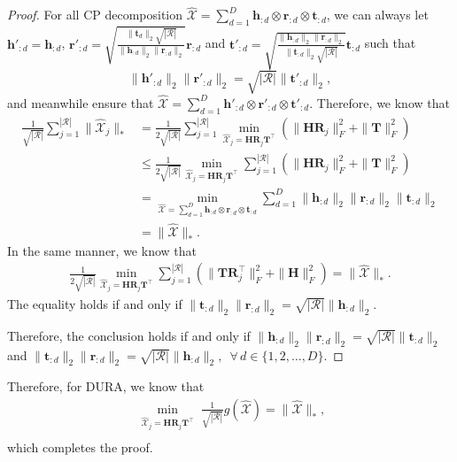 \documentclass{article}
\begin{document}
\begin{proof}
For all CP decomposition $\hat{\mathcal{X}}=\sum_{d=1}^D \textbf{h}_{:d} \otimes \textbf{r}_{:d} \otimes \textbf{t}_{:d}$,  we can always let $\textbf{h}'_{:d}=\textbf{h}_{:d}$, $\textbf{r}'_{:d}=\sqrt{\frac{\|\textbf{t}_d\|_2\sqrt{|\mathcal{R}|}}{\|\textbf{h}_{:d}\|_2\|\textbf{r}_{:d}\|_2}}\textbf{r}_{:d}$ and $\textbf{t}'_{:d}= \sqrt{\frac{\|\textbf{h}_{:d}\|_2\|\textbf{r}_{:d}\|_2}{\|\textbf{t}_{:d}\|_2\sqrt{|\mathcal{R}|}}}\textbf{t}_{:d}$ such that
$$\|\textbf{h}'_{:d}\|_2\|\textbf{r}'_{:d}\|_2=\sqrt{|\mathcal{R}|}\|\textbf{t}'_{:d}\|_2,$$
and meanwhile ensure that $\hat{\mathcal{X}}=\sum_{d=1}^D \textbf{h}'_{:d} \otimes \textbf{r}'_{:d} \otimes \textbf{t}'_{:d}$. Therefore, we know that
\begin{align*}
    \frac{1}{\sqrt{|\mathcal{R}|}}\sum_{j=1}^{|\mathcal{R}|}\|\hat{\mathcal{X}}_j\|_*&=\frac{1}{2\sqrt{|\mathcal{R}|}}\sum_{j=1}^{|\mathcal{R}|}\min_{\hat{\mathcal{X}}_j=\textbf{H}\textbf{R}_j\textbf{T}^\top}(\|\textbf{H}\textbf{R}_j\|_F^2+\|\textbf{T}\|_F^2)\\
    &\le\frac{1}{2\sqrt{|\mathcal{R}|}}\min_{\hat{\mathcal{X}}_j=\textbf{H}\textbf{R}_j\textbf{T}^\top}\sum_{j=1}^{|\mathcal{R}|}(\|\textbf{H}\textbf{R}_j\|_F^2+\|\textbf{T}\|_F^2)\\
    &= \min_{\hat{\mathcal{X}}=\sum_{d=1}^D \textbf{h}_{:d}\otimes \textbf{r}_{:d}\otimes \textbf{t}_{:d}}\sum_{d=1}^D\|\textbf{h}_{:d}\|_2\|\textbf{r}_{:d}\|_2\|\textbf{t}_{:d}\|_2\\
    &=\|\hat{\mathcal{X}}\|_*.
\end{align*}
In the same manner, we know that
\begin{align*}
    \frac{1}{2\sqrt{|\mathcal{R}|}}\min_{\hat{\mathcal{X}}_j=\textbf{H}\textbf{R}_j\textbf{T}^\top}\sum_{j=1}^{|\mathcal{R}|}(\|\textbf{T}\textbf{R}_j^\top\|_F^2+\|\textbf{H}\|_F^2)=\|\hat{\mathcal{X}}\|_*.
\end{align*}
The equality holds if and only if $ \|\textbf{t}_{:d}\|_2\|\textbf{r}_{:d}\|_2=\sqrt{|\mathcal{R}|}\|\textbf{h}_{:d}\|_2$.

Therefore, the conclusion holds if and only if $
  \|\textbf{h}_{:d}\|_2\|\textbf{r}_{:d}\|_2=\sqrt{|\mathcal{R}|}\|\textbf{t}_{:d}\|_2
$
and
$
  \|\textbf{t}_{:d}\|_2\|\textbf{r}_{:d}\|_2=\sqrt{|\mathcal{R}|}\|\textbf{h}_{:d}\|_2,
$
$\,\forall\,d\in\{1,2,\ldots, D\}$.
\end{proof}

Therefore, for DURA, we know that 
\begin{align*}
     \min_{\substack{\hat{\mathcal{X}}_j=\textbf{H} \textbf{R}_j\textbf{T}^\top\\  }}\frac{1}{\sqrt{|\mathcal{R}|}}g(\hat{\mathcal{X}})=\|\hat{\mathcal{X}}\|_*,
\end{align*}
which completes the proof.
\end{document}
